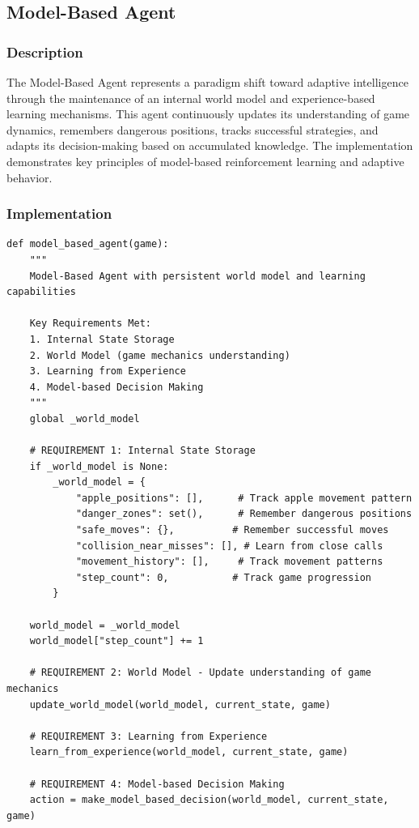 \documentclass[11pt,a4paper]{article}
\begin{document}
\subsection{Model-Based Agent}

\subsubsection{Description}
The Model-Based Agent represents a paradigm shift toward adaptive intelligence through the maintenance of an internal world model and experience-based learning mechanisms. This agent continuously updates its understanding of game dynamics, remembers dangerous positions, tracks successful strategies, and adapts its decision-making based on accumulated knowledge. The implementation demonstrates key principles of model-based reinforcement learning and adaptive behavior.

\subsubsection{Implementation}
\begin{lstlisting}[caption=Model-Based Agent]
def model_based_agent(game):
    """
    Model-Based Agent with persistent world model and learning capabilities
    
    Key Requirements Met:
    1. Internal State Storage
    2. World Model (game mechanics understanding)  
    3. Learning from Experience
    4. Model-based Decision Making
    """
    global _world_model

    # REQUIREMENT 1: Internal State Storage
    if _world_model is None:
        _world_model = {
            "apple_positions": [],      # Track apple movement pattern
            "danger_zones": set(),      # Remember dangerous positions
            "safe_moves": {},          # Remember successful moves
            "collision_near_misses": [], # Learn from close calls
            "movement_history": [],     # Track movement patterns
            "step_count": 0,           # Track game progression
        }

    world_model = _world_model
    world_model["step_count"] += 1

    # REQUIREMENT 2: World Model - Update understanding of game mechanics
    update_world_model(world_model, current_state, game)

    # REQUIREMENT 3: Learning from Experience
    learn_from_experience(world_model, current_state, game)

    # REQUIREMENT 4: Model-based Decision Making
    action = make_model_based_decision(world_model, current_state, game)
\end{lstlisting}
\end{document}
